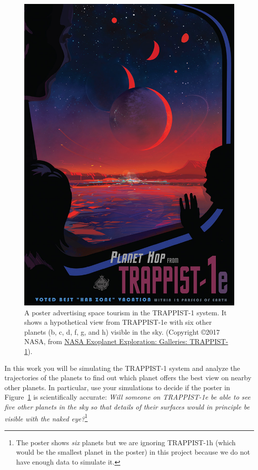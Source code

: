 \documentclass[letterpaper]{scrartcl}
\begin{document}
\begin{figure}[btp]
  \centering
  \includegraphics[height=0.88\textheight]{figs/2159_posternormalsize.jpg}
  \caption{A poster advertising space tourism in the TRAPPIST-1 system. It
    shows a hypothetical view from TRAPPIST-1e with six other planets
    (b, c, d, f, g, and h) visible in the sky. (Copyright \copyright 2017
    NASA, from
    \href{https://exoplanets.nasa.gov/resources/2159/?linkId=34784370}{NASA
      Exoplanet Exploration: Galleries: TRAPPIST-1}).}
  \label{fig:poster}
\end{figure}

In this work you will be simulating the TRAPPIST-1 system and analyze
the trajectories of the planets to find out which planet offers the
best view on nearby other planets. In particular, use your simulations
to decide if the poster in Figure~\ref{fig:poster} is scientifically
accurate: \emph{Will someone on TRAPPIST-1e be able to see five other
  planets in the sky so that details of their surfaces would in
  principle be visible with the naked eye?}\footnote{The poster shows
  \emph{six} planets but we are ignoring TRAPPIST-1h (which would be
  the smallest planet in the poster) in this project because we do not
  have enough data to simulate it.}
\end{document}
